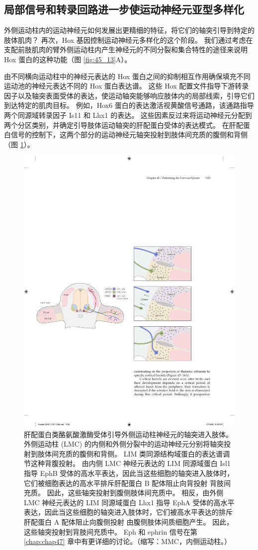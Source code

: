 \subsection{局部信号和转录回路进一步使运动神经元亚型多样化}
外侧运动柱内的运动神经元如何发展出更精细的特征，将它们的轴突引导到特定的肢体肌肉？ 再次，Hox 基因控制运动神经元多样化的这个阶段。 我们通过考虑在支配前肢肌肉的臂外侧运动柱内产生神经元的不同分裂和集合特性的途径来说明 Hox 蛋白的这种功能（图 \ref{fig:45_13}A）。

由不同横向运动柱中的神经元表达的 Hox 蛋白之间的抑制相互作用确保填充不同运动池的神经元表达不同的 Hox 蛋白表达谱。 这些 Hox 配置文件指导下游转录因子以及轴突表面受体的表达，使运动轴突能够响应肢体内的局部线索，引导它们到达特定的肌肉目标。 例如，Hox6 蛋白的表达激活视黄酸信号通路，该通路指导两个同源域转录因子 Is11 和 Lhx1 的表达。 这些因素反过来将运动神经元分配到两个分区类别，并确定引导肢体运动轴突的肝配蛋白受体的表达模式。 
在肝配蛋白信号的控制下，这两个部分的运动神经元轴突投射到肢体间充质的腹侧和背侧（图 \ref{fig:45_14}）。

\begin{figure}[htbp]
	\centering
	\includegraphics[width=0.65\linewidth]{chap45/fig_45_14}
	\caption{肝配蛋白类酪氨酸激酶受体引导外侧运动柱神经元的轴突进入肢体。 外侧运动柱 (LMC) 的内侧和外侧分裂中的运动神经元分别将轴突投射到肢体间充质的腹侧和背侧。 LIM 类同源结构域蛋白的表达谱调节这种背腹投射。 由内侧 LMC 神经元表达的 LIM 同源域蛋白 Isl1 指导 EphB 受体的高水平表达，因此当这些细胞的轴突进入肢体时，它们被细胞表达的高水平排斥肝配蛋白 B 配体阻止向背投射 背肢间充质。 因此，这些轴突投射到腹侧肢体间充质中。 相反，由外侧 LMC 神经元表达的 LIM 同源域蛋白 Lhx1 指导 EphA 受体的高水平表达，因此当这些细胞的轴突进入肢体时，它们被高水平表达的排斥肝配蛋白 A 配体阻止向腹侧投射 由腹侧肢体间质细胞产生。 因此，这些轴突投射到背肢间充质中。 Eph 和 ephrin 信号在第 \ref{chap:chap47} 章中有更详细的讨论。（缩写：MMC，内侧运动柱。）}
	\label{fig:45_14}
\end{figure}

